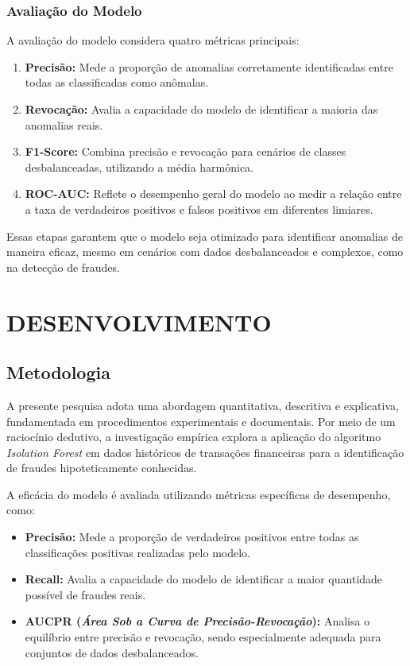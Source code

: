\documentclass[12pt,a4paper]{article}
\begin{document}
\subsubsection{Avaliação do Modelo}
A avaliação do modelo considera quatro métricas principais:
\begin{enumerate}
    \item \textbf{Precisão:} Mede a proporção de anomalias corretamente identificadas entre todas as classificadas como anômalas.
    \item \textbf{Revocação:} Avalia a capacidade do modelo de identificar a maioria das anomalias reais.
    \item \textbf{F1-Score:} Combina precisão e revocação para cenários de classes desbalanceadas, utilizando a média harmônica.
    \item \textbf{ROC-AUC:} Reflete o desempenho geral do modelo ao medir a relação entre a taxa de verdadeiros positivos e falsos positivos em diferentes limiares.
\end{enumerate}

Essas etapas garantem que o modelo seja otimizado para identificar anomalias de maneira eficaz, mesmo em cenários com dados desbalanceados e complexos, como na detecção de fraudes.



\section{DESENVOLVIMENTO}
\subsection{Metodologia}

A presente pesquisa adota uma abordagem quantitativa, descritiva e explicativa, fundamentada em procedimentos experimentais e documentais. Por meio de um raciocínio dedutivo, a investigação empírica explora a aplicação do algoritmo \textit{Isolation Forest} em dados históricos de transações financeiras para a identificação de fraudes hipoteticamente conhecidas. 

A eficácia do modelo é avaliada utilizando métricas específicas de desempenho, como:
\begin{itemize}
    \item \textbf{Precisão:} Mede a proporção de verdadeiros positivos entre todas as classificações positivas realizadas pelo modelo.
    \item \textbf{Recall:} Avalia a capacidade do modelo de identificar a maior quantidade possível de fraudes reais.
    \item \textbf{AUCPR (\textit{Área Sob a Curva de Precisão-Revocação}):} Analisa o equilíbrio entre precisão e revocação, sendo especialmente adequada para conjuntos de dados desbalanceados.
\end{itemize}
\end{document}
